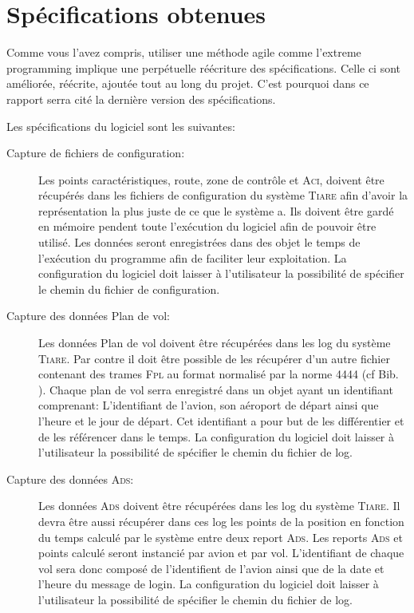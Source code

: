 
\section{Spécifications obtenues}
Comme vous l'avez compris, utiliser une méthode agile comme l'extreme programming  implique une perpétuelle réécriture des spécifications. Celle ci sont améliorée, réécrite, ajoutée tout au long du projet. C'est pourquoi dans ce rapport serra cité la dernière version des spécifications.

Les spécifications du logiciel sont les suivantes:
\begin{description}
    \item[Capture de fichiers de configuration:] Les points caractéristiques, route, zone de contrôle et \textsc{Aci}, doivent être récupérés dans les fichiers de configuration du système \textsc{Tiare} afin d'avoir la représentation la plus juste de ce que le système a. Ils doivent être gardé en mémoire pendent toute l'exécution du logiciel afin de pouvoir être utilisé. Les données seront enregistrées dans des objet le temps de l'exécution du programme afin de faciliter leur exploitation. La configuration du logiciel doit laisser à l'utilisateur la possibilité de spécifier le chemin du fichier de configuration.

    \item[Capture des données Plan de vol:] Les données Plan de vol doivent être récupérées dans les log du système \textsc{Tiare}. Par contre il doit être possible de les récupérer d'un autre fichier contenant des trames \textsc{Fpl} au format normalisé par la norme 4444 (cf Bib. \cite{4444}). Chaque plan de vol serra enregistré dans un objet ayant un identifiant comprenant: L'identifiant de l'avion, son aéroport de départ ainsi que l'heure et le jour de départ. Cet identifiant a pour but de les différentier et de les référencer dans le temps. La configuration du logiciel doit laisser à l'utilisateur la possibilité de spécifier le chemin du fichier de log.

    \item[Capture des données \textsc{Ads}:] Les données \textsc{Ads} doivent être récupérées dans les log du système \textsc{Tiare}. Il devra être aussi récupérer dans ces log les points de la position en fonction du temps calculé par le système entre deux report \textsc{Ads}. Les reports \textsc{Ads} et points calculé seront instancié par avion et par vol. L'identifiant de chaque vol sera donc composé de l'identifient de l'avion ainsi que de la date et l'heure du message de login. La configuration du logiciel doit laisser à l'utilisateur la possibilité de spécifier le chemin du fichier de log.


\end{description}
